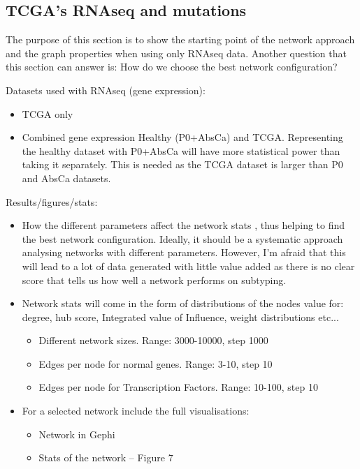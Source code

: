 \subsection{TCGA's RNAseq and mutations}


The purpose of this section is to show the starting point of the network approach and the graph properties when using only RNAseq data. Another question that this section can answer is: How do we choose the best network configuration?

Datasets used with RNAseq (gene expression):
\begin{itemize}

    \item TCGA only
    \item Combined gene expression Healthy (P0+AbsCa) and TCGA. Representing the healthy dataset with P0+AbsCa will have more statistical power than taking it separately. This is needed as the TCGA dataset is larger than P0 and AbsCa datasets.
\end{itemize}

Results/figures/stats:
\begin{itemize}

    \item How the different parameters affect the network stats , thus helping to find the best network configuration. Ideally, it should be a systematic approach analysing networks with different parameters. However, I’m afraid that this will lead to a lot of data generated with little value added as there is no clear score that tells us how well a network performs on subtyping.
    \item Network stats will come in the form of distributions of the nodes value for: degree, hub score, Integrated value of Influence, weight distributions etc...
          \begin{itemize}
              \item Different network sizes. Range: 3000-10000, step 1000
              \item Edges per node for normal genes. Range: 3-10, step 10
              \item Edges per node for Transcription Factors. Range: 10-100, step 10
          \end{itemize}
    \item For a selected network include the full visualisations:
          \begin{itemize}

              \item Network in Gephi
              \item Stats of the network – Figure 7
              \item Clustering of the Module Evaluation Value (MEV)
          \end{itemize}

    \item The selected experiment I will compare it with our previous approach and the other classification such as TCGA, consensus, Lund – See an example in Figure 8
\end{itemize}


